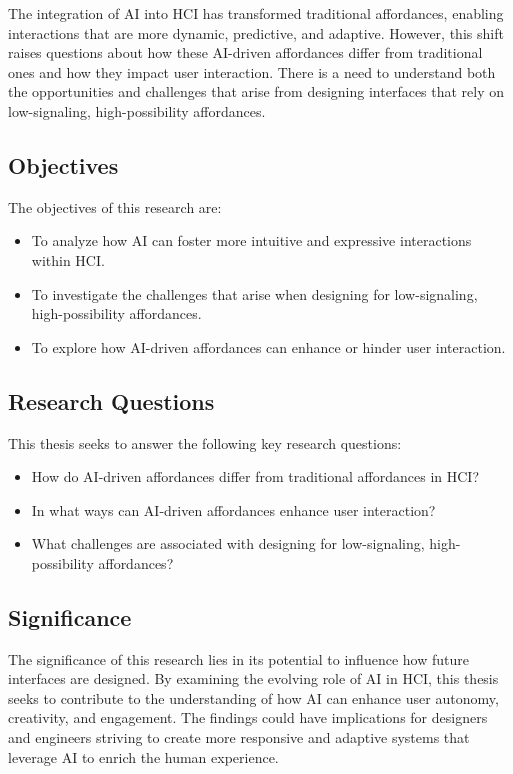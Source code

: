 The integration of AI into HCI has transformed traditional affordances, enabling interactions that are more dynamic, predictive, and adaptive.
However, this shift raises questions about how these AI-driven affordances differ from traditional ones and how they impact user interaction.
There is a need to understand both the opportunities and challenges that arise from designing interfaces that rely on low-signaling, high-possibility affordances.

\subsection{Objectives}

The objectives of this research are:
\begin{itemize}
    \item To analyze how AI can foster more intuitive and expressive interactions within HCI.
    \item To investigate the challenges that arise when designing for low-signaling, high-possibility affordances.
    \item To explore how AI-driven affordances can enhance or hinder user interaction.
\end{itemize}

\subsection{Research Questions}

This thesis seeks to answer the following key research questions:

\begin{itemize}
    \item How do AI-driven affordances differ from traditional affordances in HCI?
    \item In what ways can AI-driven affordances enhance user interaction?
    \item What challenges are associated with designing for low-signaling, high-possibility affordances?
\end{itemize}

\subsection{Significance}

The significance of this research lies in its potential to influence how future interfaces are designed.
By examining the evolving role of AI in HCI, this thesis seeks to contribute to the understanding of how AI can enhance user autonomy, creativity, and engagement.
The findings could have implications for designers and engineers striving to create more responsive and adaptive systems that leverage AI to enrich the human experience.

